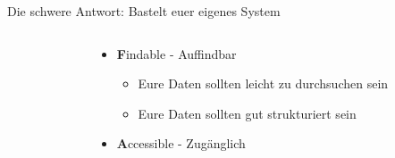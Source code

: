 \documentclass[aspectratio=169,shownotes]{beamer}
\begin{document}
\begin{frame}{Die schwere Antwort: Bastelt euer eigenes System}
    \begin{columns}[t]
        \begin{column}[t]{0.3\textwidth}
        \end{column}
        \begin{column}[t]{0.69\textwidth}
            \vspace{-8cm}
            \begin{itemize}
                \setlength{\itemindent}{-2em}
                \item[] \textbf{F}indable - Auffindbar
                \begin{itemize}
                    \item Eure Daten sollten leicht zu durchsuchen sein
                    \item Eure Daten sollten gut strukturiert sein
                \end{itemize}
                \item[] \textbf{A}ccessible - Zugänglich

\end{itemize}
\end{column}
\end{columns}
\end{frame}
\end{document}
